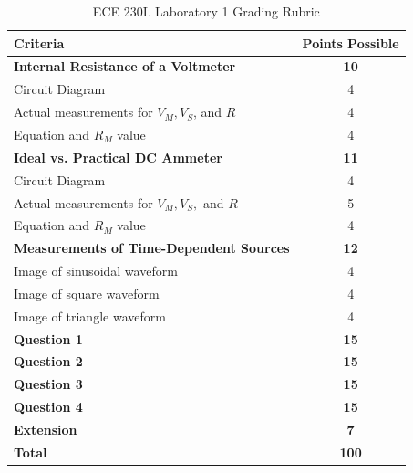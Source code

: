 \documentclass[12pt]{../manual}
\begin{document}
%
\newpage
{}
{}
\hspace{0pt}
\vfill
\begin{table}[ht!]
\caption{ECE 230L Laboratory 1 Grading Rubric}
\centering
\begin{tabular}{l|c} \hline
Criteria & Points Possible \\ \hline \hline
\textbf{Internal Resistance of a Voltmeter}			& \textbf{10} \\
Circuit Diagram												& 4 \\
Actual measurements for $V_M, V_S$, and $R$			& 4 \\
Equation and $R_M$ value									& 4 \\ \hline
\textbf{Ideal vs. Practical DC Ammeter}				& \textbf{11} \\
Circuit Diagram												& 4 \\
Actual measurements for $V_M, V_S,$ and $R$			& 5 \\
Equation and $R_M$ value									& 4 \\ \hline
\textbf{Measurements of Time-Dependent Sources}		& \textbf{12} \\
Image of sinusoidal waveform								& 4 \\
Image of square waveform									& 4 \\
Image of triangle waveform 								& 4 \\ \hline
\textbf{Question 1}											& \textbf{15} \\ \hline
\textbf{Question 2}											& \textbf{15} \\ \hline
\textbf{Question 3}											& \textbf{15} \\ \hline
\textbf{Question 4}											& \textbf{15} \\ \hline
\textbf{Extension}											& \textbf{7} \\ \hline
\textbf{Total}												& \textbf{100} \\ \hline
\end{tabular}
\end{table}
\vfill
\hspace{0pt}
%
\end{document}
